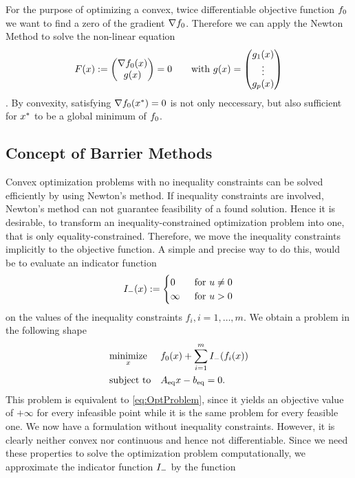For the purpose of optimizing a convex, twice differentiable objective function $ f_0 $ we want to find a zero of the gradient $ \nabla f_0 $. Therefore we can apply the Newton Method to solve the non-linear equation \[ F(x) := \begin{pmatrix} {\nabla f_0(x)} \\ {g(x)} \end{pmatrix} = 0 \qquad \text{with }  g(x) = \begin{pmatrix} {g_1(x)} \\ {\vdots} \\ {g_p(x)} \end{pmatrix} \]. By convexity, satisfying $ \nabla f_0 (x^*) = 0$ is not only neccessary, but also sufficient for $ x^* $ to be a global minimum of $ f_0 $.\\


\subsection{Concept of Barrier Methods}
Convex optimization problems with no inequality constraints can  be solved efficiently by using Newton's method. If inequality constraints are involved, Newton's method can not guarantee feasibility of a found solution. Hence it is desirable, to transform an inequality-constrained optimization problem into one, that is only equality-constrained. Therefore, we move the inequality constraints implicitly to the objective function.
A simple and precise way to do this, would be to evaluate an  indicator function  
\begin{align}
	{I}_{\mathrm{-}} (x) :=
	\begin{cases}
		0 \quad &\text{for } u \neq 0\\
		\infty &\text{for } u > 0
	\end{cases}
\end{align}
on the values of the inequality constraints $ f_i, i=1,\dots,m $. We obtain a problem in the following shape
\begin{align}
	\begin{aligned}
	& \underset{x}{\text{minimize}}
	& & f_0(x) + \sum_{i=1}^{m} {I}_{\mathrm{-}}(f_i(x))\\
	& \text{subject to}
	& & {A}_{\mathrm{eq}} x - {b}_{\mathrm{eq}} = 0.
	\end{aligned} \label{eq:ifctProblem}
\end{align}
This problem is equivalent to \eqref{eq:OptProblem}, since it yields an objective value of $ +\infty  $ for every infeasible point while it is the same problem for every feasible one. We now have a formulation without inequality constraints. However, it is clearly neither convex nor continuous and hence not differentiable. Since we need these properties to solve the optimization problem computationally, we approximate the indicator function $ {I}_{\mathrm{-}} $ by the function
